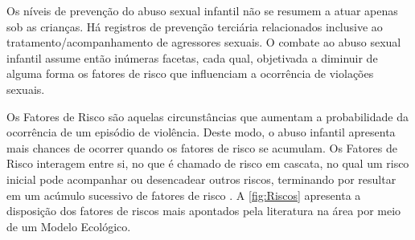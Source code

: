 Os níveis de prevenção do abuso sexual infantil não se resumem a atuar apenas sob as crianças. Há registros de prevenção terciária relacionados inclusive ao tratamento/acompanhamento de agressores sexuais. O combate ao abuso sexual infantil assume então inúmeras facetas, cada qual, objetivada a diminuir de alguma forma os fatores de risco que influenciam a ocorrência de violações sexuais.

Os Fatores de Risco são aquelas circunstâncias que aumentam a probabilidade da ocorrência de um episódio de violência. Deste modo, o abuso infantil apresenta mais chances de ocorrer quando os fatores de risco se acumulam. Os Fatores de Risco interagem entre si, no que é chamado de risco em cascata, no qual um risco inicial pode acompanhar ou desencadear outros riscos, terminando por resultar em um acúmulo sucessivo de fatores de risco \cite{Recommendations2019Taylor}. A \autoref{fig:Riscos} apresenta a disposição dos fatores de riscos mais apontados pela literatura na área por meio de um Modelo Ecológico. 








